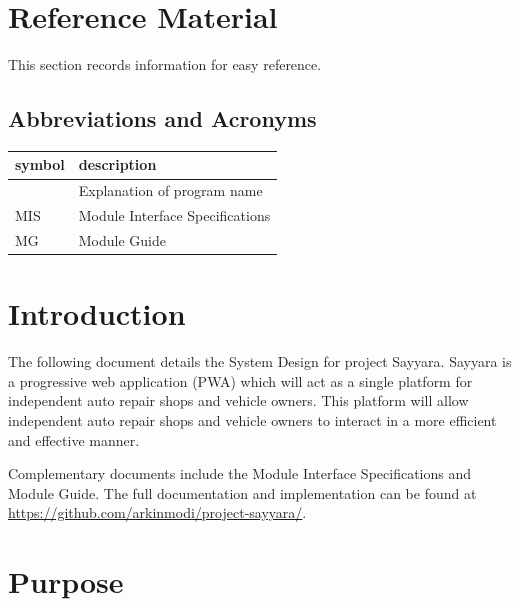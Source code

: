 \documentclass[12pt, titlepage]{article}
\begin{document}
\newpage

\section{Reference Material}

This section records information for easy reference.

\subsection{Abbreviations and Acronyms}

\begin{tabular}{l l}
	\toprule
	\textbf{symbol} & \textbf{description}            \\
	\midrule
	\progname       & Explanation of program name     \\
	MIS             & Module Interface Specifications \\
	MG              & Module Guide                    \\
	\bottomrule
\end{tabular}

\newpage

\tableofcontents

\newpage

\listoftables

\listoffigures

\newpage


\section{Introduction}

The following document details the System Design for project Sayyara. Sayyara is a progressive web
application (PWA) which will act as a single platform for independent auto repair shops and vehicle
owners. This platform will allow independent auto repair shops and vehicle owners to interact in a
more efficient and effective manner.

Complementary documents include the Module Interface Specifications and Module Guide. The full
documentation and implementation can be found at
\url{https://github.com/arkinmodi/project-sayyara/}.

\section{Purpose}
\end{document}
